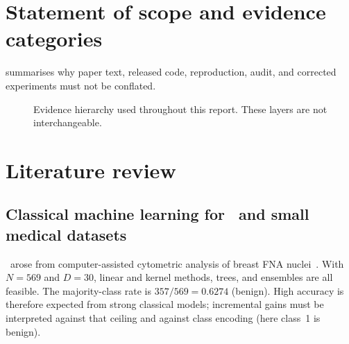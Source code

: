 \documentclass[11pt,a4paper]{article}
\begin{document}
\section{Statement of scope and evidence categories}
\label{sec:scope}

\begin{center}
\end{center}

 summarises why paper text, released code, reproduction, audit, and corrected experiments must not be conflated.

\begin{figure}[H]
\centering
{}
\caption{Evidence hierarchy used throughout this report. These layers are not interchangeable.}
\label{fig:evidence-hierarchy}
\end{figure}

\section{Literature review}
\label{sec:lit}

\subsection{Classical machine learning for \wdbc\ and small medical datasets}

\wdbc\ arose from computer-assisted cytometric analysis of breast FNA nuclei~\cite{street1993nuclear,wolberg1995breast,mangasarian1995breast}. With $N=569$ and $D=30$, linear and kernel methods, trees, and ensembles are all feasible. The majority-class rate is $357/569=0.6274$ (benign). High accuracy is therefore expected from strong classical models; incremental gains must be interpreted against that ceiling and against class encoding (here class~1 is benign).
\end{document}
